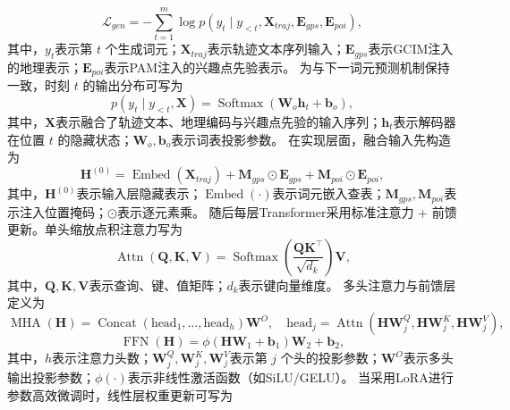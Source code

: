 \begin{equation}
\mathcal{L}_{gen}=-\sum_{t=1}^{m}\log p(y_t\mid y_{<t},\mathbf{X}_{traj},\mathbf{E}_{gps},\mathbf{E}_{poi}),
\label{eq:c3-lgen}
\end{equation}
其中，$y_t$表示第 $t$ 个生成词元；$\mathbf{X}_{traj}$表示轨迹文本序列输入；$\mathbf{E}_{gps}$表示GCIM注入的地理表示；$\mathbf{E}_{poi}$表示PAM注入的兴趣点先验表示。
为与下一词元预测机制保持一致，时刻 $t$ 的输出分布可写为
\begin{equation}
p(y_t\mid y_{<t},\mathbf{X})=\operatorname{Softmax}\!\left(\mathbf{W}_o\mathbf{h}_t+\mathbf{b}_o\right),
\label{eq:c3-next-token}
\end{equation}
其中，$\mathbf{X}$表示融合了轨迹文本、地理编码与兴趣点先验的输入序列；$\mathbf{h}_t$表示解码器在位置 $t$ 的隐藏状态；$\mathbf{W}_o,\mathbf{b}_o$表示词表投影参数。
在实现层面，融合输入先构造为
\begin{equation}
\mathbf{H}^{(0)}=\operatorname{Embed}(\mathbf{X}_{traj})+\mathbf{M}_{gps}\odot\mathbf{E}_{gps}+\mathbf{M}_{poi}\odot\mathbf{E}_{poi},
\label{eq:c3-input-fusion}
\end{equation}
其中，$\mathbf{H}^{(0)}$表示输入层隐藏表示；$\operatorname{Embed}(\cdot)$表示词元嵌入查表；$\mathbf{M}_{gps},\mathbf{M}_{poi}$表示注入位置掩码；$\odot$表示逐元素乘。
随后每层Transformer采用标准注意力 + 前馈更新。单头缩放点积注意力写为
\begin{equation}
\operatorname{Attn}(\mathbf{Q},\mathbf{K},\mathbf{V})=\operatorname{Softmax}\!\left(\frac{\mathbf{Q}\mathbf{K}^{\top}}{\sqrt{d_k}}\right)\mathbf{V},
\label{eq:c3-attn}
\end{equation}
其中，$\mathbf{Q},\mathbf{K},\mathbf{V}$表示查询、键、值矩阵；$d_k$表示键向量维度。
多头注意力与前馈层定义为
\begin{equation}
\operatorname{MHA}(\mathbf{H})=\operatorname{Concat}(\text{head}_1,\ldots,\text{head}_h)\mathbf{W}^{O},\quad
\text{head}_j=\operatorname{Attn}(\mathbf{H}\mathbf{W}_j^Q,\mathbf{H}\mathbf{W}_j^K,\mathbf{H}\mathbf{W}_j^V),
\label{eq:c3-mha}
\end{equation}
\begin{equation}
\operatorname{FFN}(\mathbf{H})=\phi(\mathbf{H}\mathbf{W}_1+\mathbf{b}_1)\mathbf{W}_2+\mathbf{b}_2,
\label{eq:c3-ffn}
\end{equation}
其中，$h$表示注意力头数；$\mathbf{W}_j^Q,\mathbf{W}_j^K,\mathbf{W}_j^V$表示第 $j$ 个头的投影参数；$\mathbf{W}^{O}$表示多头输出投影参数；$\phi(\cdot)$表示非线性激活函数（如SiLU/GELU）。
当采用LoRA进行参数高效微调时，线性层权重更新可写为
